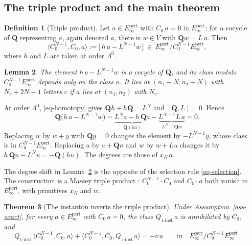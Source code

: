 \documentclass[11pt]{article}
\numberwithin{equation}{section}
\numberwithin{figure}{section}
\numberwithin{table}{section}
\newtheorem{theorem}{Theorem}[section]
\newtheorem{lemma}[theorem]{Lemma}
\theoremstyle{definition}
\newtheorem{definition}[theorem]{Definition}
\newcommand{\Qp}{\mathbf Q}
\newcommand{\Qi}{Q_{1\text{-}\mathrm{inst}}}
\newcommand{\Ep}{E_\infty^{\mathrm{pert}}}
\begin{document}
\subsection{The triple product and the main theorem}\label{sec-theorem}

\begin{definition}[Triple product]\label{def-triple}
Let $a\in\Ep$ with $C_0\,a=0$ in $\Ep$: for a cocycle of $\Qp$ representing $a$, again denoted $a$, there is $w\in V$ with $\Qp w=L\,a$. Then
\begin{equation}\label{eq-triple}
\langle C_0^{N-1},C_0,a\rangle:=\big[\,h\,a-L^{N-1}w\,\big]\ \in\ \Ep\big/C_0^{N-1}\Ep ,
\end{equation}
where $h$ and $L$ are taken at order $\Lambda^0$.
\end{definition}

\begin{lemma}\label{lem-triple}
The element $h\,a-L^{N-1}w$ is a cocycle of $\Qp$, and its class modulo $C_0^{N-1}\Ep$ depends only on the class $a$. It lies at $(n_1+N,n_2+N)$ with $N_c+2N-1$ letters $c$ if $a$ lies at $(n_1,n_2)$ with $N_c$.
\end{lemma}

\begin{proofbox}
At order $\Lambda^0$, \eqref{eq-homotopy} gives $\Qp h+h\Qp=L^N$ and $[\Qp,L]=0$. Hence
\[
\Qp\big(h\,a-L^{N-1}w\big)=\underbrace{L^Na-h\,\Qp a}_{\Qp(ha)}-\underbrace{L^{N-1}L\,a}_{L^{N-1}\Qp w}=0 .
\]
Replacing $w$ by $w+y$ with $\Qp y=0$ changes the element by $-L^{N-1}y$, whose class is in $C_0^{N-1}\Ep$. Replacing $a$ by $a+\Qp u$ and $w$ by $w+Lu$ changes it by $h\,\Qp u-L^Nu=-\Qp(hu)$. The degrees are those of $x_N\,a$.
\end{proofbox}

The degree shift in Lemma~\ref{lem-triple} is the opposite of the selection rule \eqref{eq-selection}. The construction is a Massey triple product \cite{Massey}: $C_0^{N-1}\cdot C_0$ and $C_0\cdot a$ both vanish in $\Ep$, with primitives $x_N$ and $w$.

\begin{theorem}[The instanton inverts the triple product]\label{thm-mechanism}
Under Assumption~\ref{ass-exact}, for every $a\in\Ep$ with $C_0\,a=0$, the class $\Qi\,a$ is annihilated by $C_0$, and
\begin{equation}\label{eq-mechanism}
\Qi\,\langle C_0^{N-1},C_0,a\rangle+\langle C_0^{N-1},C_0,\Qi\,a\rangle=-\nu\,a
\qquad\text{in}\quad \Ep\big/C_0^{N-1}\Ep .
\end{equation}
\end{theorem}
\end{document}
